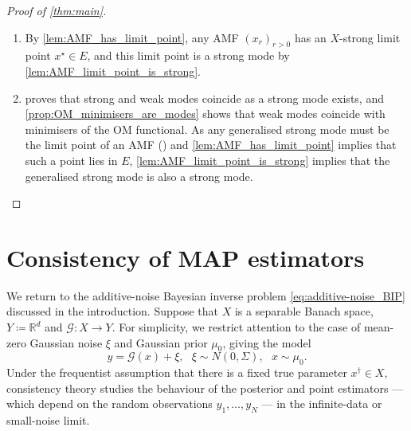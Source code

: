 \documentclass[11pt]{article}
\newcommand*{\defeq}{\coloneqq}
\newcommand*{\Reals}{\mathbb{R}}
\theoremstyle{plain}
\theoremstyle{definition}
\numberwithin{equation}{section}
\numberwithin{figure}{section}
\numberwithin{table}{section}
\begin{document}
\begin{proof}[Proof of \cref{thm:main}]
	\begin{enumerate}[label=(\alph*)]
		\item
		By \cref{lem:AMF_has_limit_point}, any AMF $(x_r)_{r > 0}$ has an $X$-strong limit point $x^{\star} \in E$, and this limit point is a strong mode by \cref{lem:AMF_limit_point_is_strong}.

		\item
		 proves that strong and weak modes coincide as a strong mode exists, and \cref{prop:OM_minimisers_are_modes} shows that weak modes coincide with minimisers of the OM functional.
		As any generalised strong mode must be the limit point of an AMF () and \cref{lem:AMF_has_limit_point} implies that such a point lies in $E$, \cref{lem:AMF_limit_point_is_strong} implies that the generalised strong mode is also a strong mode.
		\qedhere
	\end{enumerate}
\end{proof}

\section{Consistency of MAP estimators}
\label{sec:consistency}

We return to the additive-noise Bayesian inverse problem \eqref{eq:additive-noise_BIP} discussed in the introduction.
Suppose that $X$ is a separable Banach space, $Y \defeq \Reals^{d}$ and $\mathcal{G} \colon X \to Y$.
For simplicity, we restrict attention to the case of mean-zero Gaussian noise $\xi$ and Gaussian prior $\mu_{0}$, giving the model
\begin{equation} \label{eq:additive-noise_BIP_Gaussian_noise}
	y = \mathcal{G}(x) + \xi,~~~\xi \sim N(0, \Sigma),~~~x \sim \mu_{0}.
\end{equation}
Under the frequentist assumption that there is a fixed true parameter $x^{\dagger} \in X$, consistency theory studies the behaviour of the posterior and point estimators --- which depend on the random observations $y_{1}, \dots, y_{N}$ --- in the infinite-data or small-noise limit.
\end{document}
